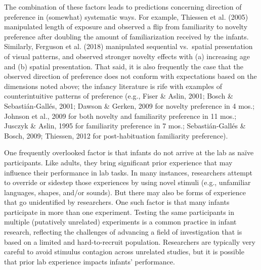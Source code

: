 \documentclass[english,man]{apa6}
\begin{document}
The combination of these factors leads to predictions concerning direction of preference in (somewhat) systematic ways. For example, Thiessen et al. (2005) manipulated length of exposure and observed a flip from familiarity to novelty preference after doubling the amount of familiarization received by the infants. Similarly, Ferguson et al. (2018) manipulated sequential vs.~spatial presentation of visual patterns, and observed stronger novelty effects with (a) increasing age and (b) spatial presentation. That said, it is also frequently the case that the observed direction of preference does not conform with expectations based on the dimensions noted above; the infancy literature is rife with examples of counterintuitive patterns of preference (e.g., Fiser \& Aslin, 2001; Bosch \& Sebastián‐Gallés, 2001; Dawson \& Gerken, 2009 for novelty preference in 4 mos.; Johnson et al., 2009 for both novelty and familiarity preference in 11 mos.; Jusczyk \& Aslin, 1995 for familiarity preference in 7 mos.; Sebastián-Gallés \& Bosch, 2009; Thiessen, 2012 for post-habituation familiarity preference).

One frequently overlooked factor is that infants do not arrive at the lab as naïve participants. Like adults, they bring significant prior experience that may influence their performance in lab tasks. In many instances, researchers attempt to override or sidestep those experiences by using novel stimuli (e.g., unfamiliar languages, shapes, and/or sounds). But there may also be forms of experience that go unidentified by researchers. One such factor is that many infants participate in more than one experiment. Testing the same participants in multiple (putatively unrelated) experiments is a common practice in infant research, reflecting the challenges of advancing a field of investigation that is based on a limited and hard-to-recruit population. Researchers are typically very careful to avoid stimulus contagion across unrelated studies, but it is possible that prior lab experience impacts infants' performance.
\end{document}
